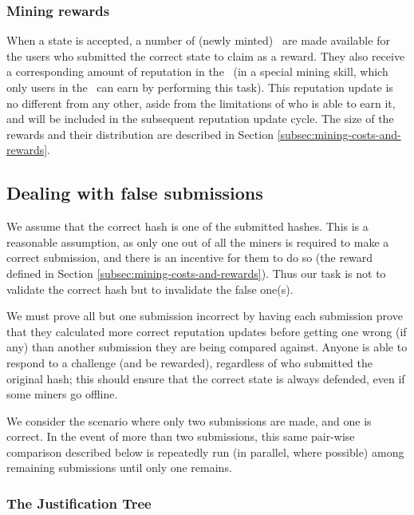 \subsubsection*{Mining rewards}

When a state is accepted, a number of (newly minted) \rcts\ are made available for the users who submitted the correct state to claim as a reward. They also receive a corresponding amount of reputation in the \rc\ (in a special mining skill, which only users in the \rc\ can earn by performing this task). This reputation update is no different from any other, aside from the limitations of who is able to earn it, and will be included in the subsequent reputation update cycle. The size of the rewards and their distribution are described in Section \ref{subsec:mining-costs-and-rewards}.

\subsection{Dealing with false submissions}\label{sec:challengeresponse}

We assume that the correct hash is one of the  submitted hashes. This is a reasonable assumption, as only one out of all the miners is required to make a correct submission, and there is an incentive for them to do so (the reward defined in Section \ref{subsec:mining-costs-and-rewards}). Thus our task is not to validate the correct hash but to invalidate the false one(s).

We must prove all but one submission incorrect by having each submission prove that they calculated more correct reputation updates before getting one wrong (if any) than another submission they are being compared against. Anyone is able to respond to a challenge (and be rewarded), regardless of who submitted the original hash; this should ensure that the correct state is always defended, even if some miners go offline.

We consider the scenario where only two submissions are made, and one is correct. In the event of more than two submissions, this same pair-wise comparison described below is repeatedly run (in parallel, where possible) among remaining submissions until only one remains.

\subsubsection{The Justification Tree}\label{sec:justificationTree}
\newcommand{\jrh}{\ensuremath{\mathbb{JRH}}}

